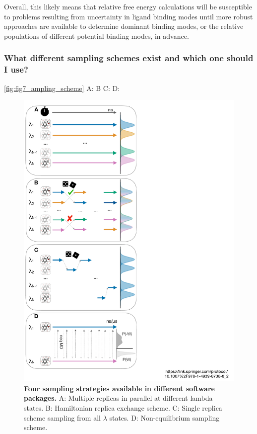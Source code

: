 \documentclass[9pt,bestpractices]{livecoms}
\begin{document}
Overall, this likely means that relative free energy calculations will be susceptible to problems resulting from uncertainty in ligand binding modes until more robust approaches are available to determine dominant binding modes, or the relative populations of different potential binding modes, in advance.

\subsubsection*{What different sampling schemes exist and which one should I use?}

\ref{fig:fig7_ampling_scheme} A:\cite{hedges2019biosimspace, song2019using } B\cite{aldeghi2015accurate, wang2015accurate,jiang2019computing} C:\cite{li2007simulated, tan2017optimally} D:\cite{aldeghi2018accurate}
\begin{figure}
    \includegraphics[width=0.95\columnwidth]{paper/figures/fig7_sampl_scheme/sampling_schemes.pdf}
    \caption{\textbf{Four sampling strategies available in different software packages.} A: Multiple replicas in parallel at different lambda states. B: Hamiltonian replica exchange scheme. C: Single replica scheme sampling from all $\lambda$ states. D: Non-equilibrium sampling scheme.}
    \label{fig:fig7_sampling_scheme}
\end{figure} 
\end{document}
